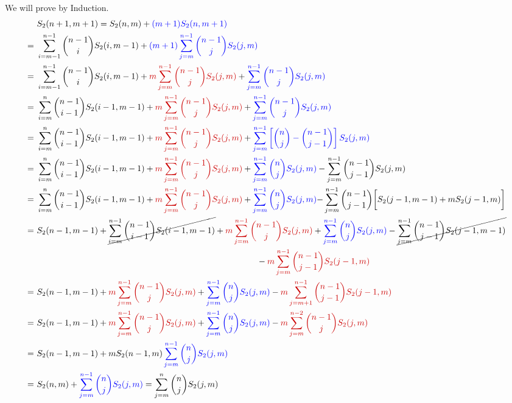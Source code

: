 \documentclass[twoside]{article}
\begin{document}
\begin{alg-proof}We will prove by Induction. 
	\begin{align*}
		& S_2(n+1,m+1)=\mathcolor{black}{S_2(n,m)}+\mathcolor{blue}{(m+1)S_2(n,m+1)} \\
		=\ & \mathcolor{black}{\sum_{i=m-1}^{n-1}\binom{n-1}{i}S_2(i,m-1)} +\mathcolor{blue}{ (m+1)\sum_{j=m}^{n-1}\binom{n-1}{j}S_2(j,m)}\\
		=\ & \mathcolor{black}{\sum_{i=m-1}^{n-1}\binom{n-1}{i}S_2(i,m-1)}+\mathcolor{red!80!black}{m\sum_{j=m}^{n-1}\binom{n-1}{j}S_2(j,m)}+\mathcolor{blue}{\sum_{j=m}^{n-1}\binom{n-1}{j}S_2(j,m)}\\
		=\ & \sum_{i=m}^{n}\binom{n-1}{i-1}S_2(i-1,m-1)+\mathcolor{red!80!black}{m\sum_{j=m}^{n-1}\binom{n-1}{j}S_2(j,m)}+\mathcolor{blue}{\sum_{j=m}^{n-1}\binom{n-1}{j}S_2(j,m)}\\
		=\ &  \sum_{i=m}^{n}\binom{n-1}{i-1}S_2(i-1,m-1) + \mathcolor{red!80!black}{m\sum_{j=m}^{n-1}\binom{n-1}{j}S_2(j,m)}+\mathcolor{blue}{\sum_{j=m}^{n-1}\lt[\binom{n}j-\binom{n-1}{j-1}\rt]S_2(j,m)}\\
		=\ &  \sum_{i=m}^{n}\binom{n-1}{i-1}S_2(i-1,m-1) + \mathcolor{red!80!black}{m\sum_{j=m}^{n-1}\binom{n-1}{j}S_2(j,m)}+\mathcolor{blue}{\sum_{j=m}^{n-1}\binom{n}jS_2(j,m)}-\sum_{j=m}^{n-1}\binom{n-1}{j-1}S_2(j,m)\\
		=\ &  \sum_{i=m}^{n}\binom{n-1}{i-1}S_2(i-1,m-1) + \mathcolor{red!80!black}{m\sum_{j=m}^{n-1}\binom{n-1}{j}S_2(j,m)}+\mathcolor{blue}{\sum_{j=m}^{n-1}\binom{n}jS_2(j,m)} {-\sum_{j=m}^{n-1}\binom{n-1}{j-1}\bigg[S_2(j-1,m-1)+mS_2(j-1,m)\bigg]}\\
		=\ & S_2(n-1,m-1)+\cancel{ \sum_{i=m}^{n-1}\binom{n-1}{i-1}S_2(i-1,m-1)} + \mathcolor{red!80!black}{m\sum_{j=m}^{n-1}\binom{n-1}{j}S_2(j,m)}+\mathcolor{blue}{\sum_{j=m}^{n-1}\binom{n}jS_2(j,m)}-\cancel{\sum_{j=m}^{n-1}\binom{n-1}{j-1}S_2(j-1,m-1)}\\
		& \hskip0.75\textwidth-\mathcolor{red!80!black}{m\sum_{j=m}^{n-1}\binom{n-1}{j-1}S_2(j-1,m)}\\
		=\ &  S_2(n-1,m-1)+\mathcolor{red!80!black}{m\sum_{j=m}^{n-1}\binom{n-1}{j}S_2(j,m)} + \mathcolor{blue}{\sum_{j=m}^{n-1}\binom{n}jS_2(j,m)}-\mathcolor{red!80!black}{m\sum_{j=m+1}^{n-1}\binom{n-1}{j-1}S_2(j-1,m)}\\
		=\ &  S_2(n-1,m-1) + \mathcolor{red!80!black}{m\sum_{j=m}^{n-1}\binom{n-1}{j}S_2(j,m)}+\mathcolor{blue}{\sum_{j=m}^{n-1}\binom{n}jS_2(j,m)}-\mathcolor{red!80!black}{m\sum_{j=m}^{n-2}\binom{n-1}{j}S_2(j,m)}\\
		=\ &  S_2(n-1,m-1)+ {mS_2(n-1,m)}\mathcolor{blue}{\sum_{j=m}^{n-1}\binom{n}jS_2(j,m)}\\
		=\ & S_2(n,m)+ \mathcolor{blue}{\sum_{j=m}^{n-1}\binom{n}jS_2(j,m)}= \sum_{j=m}^{n}\binom{n}jS_2(j,m)
	\end{align*}
\end{alg-proof}
\end{document}
